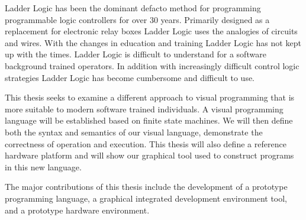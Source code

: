 
Ladder Logic has been the dominant defacto method for programming programmable logic controllers for over 30 years. Primarily designed as a replacement for electronic relay boxes Ladder Logic uses the analogies of circuits and wires. With the changes in education and training Ladder Logic has not kept up with the times. Ladder Logic is difficult to understand for a software background trained operators. In addition with increasingly difficult control logic strategies Ladder Logic has become cumbersome and difficult to use.

This thesis seeks to examine a different approach to visual programming that is more suitable to modern software trained individuals. A visual programming language will be established based on finite state machines. We will then define both the syntax and semantics of our visual language, demonstrate the correctness of operation and execution. This thesis will also define a reference hardware platform and will show our graphical tool used to construct programs in this new language.

The major contributions of this thesis include the development of a prototype programming language, a graphical integrated development environment tool, and a prototype hardware environment.